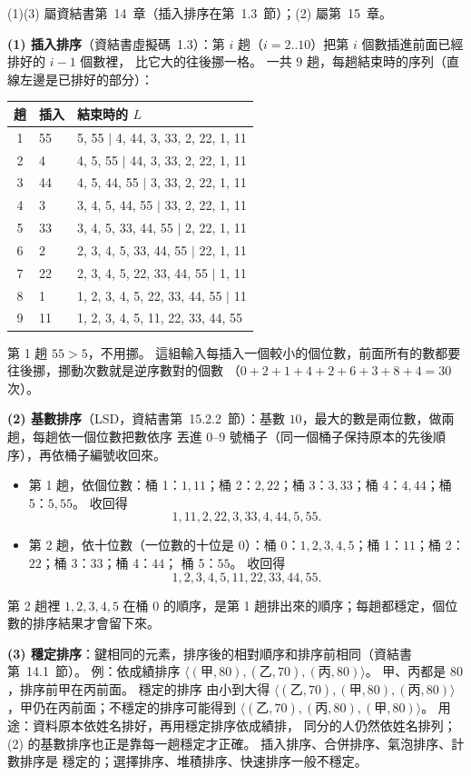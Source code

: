 \begin{pastsoln}
(1)(3) 屬資結書第~14~章（插入排序在第~1.3~節）；(2) 屬第~15~章。

\textbf{(1) 插入排序}（資結書虛擬碼~1.3）：第 $i$ 趟（$i = 2..10$）把第 $i$ 個數插進前面已經排好的 $i - 1$ 個數裡，
比它大的往後挪一格。 一共 $9$ 趟，每趟結束時的序列（直線左邊是已排好的部分）：
\begin{center}
\begin{tabular}{cll}
\toprule
趟 & 插入 & 結束時的 $L$ \\
\midrule
1 & 55 & 5, 55 $\mid$ 4, 44, 3, 33, 2, 22, 1, 11 \\
2 & 4 & 4, 5, 55 $\mid$ 44, 3, 33, 2, 22, 1, 11 \\
3 & 44 & 4, 5, 44, 55 $\mid$ 3, 33, 2, 22, 1, 11 \\
4 & 3 & 3, 4, 5, 44, 55 $\mid$ 33, 2, 22, 1, 11 \\
5 & 33 & 3, 4, 5, 33, 44, 55 $\mid$ 2, 22, 1, 11 \\
6 & 2 & 2, 3, 4, 5, 33, 44, 55 $\mid$ 22, 1, 11 \\
7 & 22 & 2, 3, 4, 5, 22, 33, 44, 55 $\mid$ 1, 11 \\
8 & 1 & 1, 2, 3, 4, 5, 22, 33, 44, 55 $\mid$ 11 \\
9 & 11 & 1, 2, 3, 4, 5, 11, 22, 33, 44, 55 \\
\bottomrule
\end{tabular}
\end{center}
第 1 趟 $55 > 5$，不用挪。 這組輸入每插入一個較小的個位數，前面所有的數都要往後挪，挪動次數就是逆序數對的個數
（$0 + 2 + 1 + 4 + 2 + 6 + 3 + 8 + 4 = 30$ 次）。

\textbf{(2) 基數排序}（LSD，資結書第~15.2.2~節）：基數 $10$，最大的數是兩位數，做兩趟，每趟依一個位數把數依序
丟進 $0$--$9$ 號桶子（同一個桶子保持原本的先後順序），再依桶子編號收回來。
\begin{itemize}
\item 第 1 趟，依個位數：桶 1：$1, 11$；桶 2：$2, 22$；桶 3：$3, 33$；桶 4：$4, 44$；桶 5：$5, 55$。 收回得
\[ 1, 11, 2, 22, 3, 33, 4, 44, 5, 55 . \]
\item 第 2 趟，依十位數（一位數的十位是 $0$）：桶 0：$1, 2, 3, 4, 5$；桶 1：$11$；桶 2：$22$；桶 3：$33$；桶 4：$44$；
桶 5：$55$。 收回得
\[ 1, 2, 3, 4, 5, 11, 22, 33, 44, 55 . \]
\end{itemize}
第 2 趟裡 $1, 2, 3, 4, 5$ 在桶 0 的順序，是第 1 趟排出來的順序；每趟都穩定，個位數的排序結果才會留下來。

\textbf{(3) 穩定排序}：鍵相同的元素，排序後的相對順序和排序前相同（資結書第~14.1~節）。 例：依成績排序
$\langle (\text{甲}, 80), (\text{乙}, 70), (\text{丙}, 80) \rangle$。 甲、丙都是 $80$，排序前甲在丙前面。 穩定的排序
由小到大得 $\langle (\text{乙}, 70), (\text{甲}, 80), (\text{丙}, 80) \rangle$，甲仍在丙前面；不穩定的排序可能得到
$\langle (\text{乙}, 70), (\text{丙}, 80), (\text{甲}, 80) \rangle$。 用途：資料原本依姓名排好，再用穩定排序依成績排，
同分的人仍然依姓名排列；(2) 的基數排序也正是靠每一趟穩定才正確。 插入排序、合併排序、氣泡排序、計數排序是
穩定的；選擇排序、堆積排序、快速排序一般不穩定。
\end{pastsoln}
